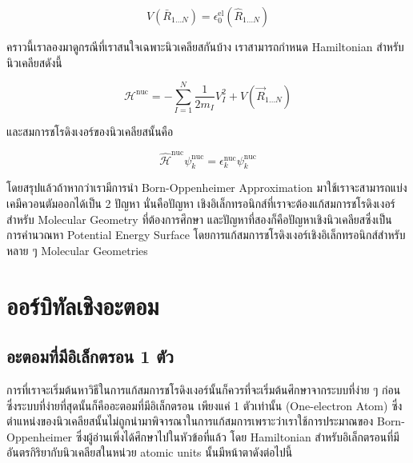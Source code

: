 \begin{equation}
    V\left(\bar{R}_{1 \dots N}\right)
    =
    \epsilon_{0}^{\mathrm{el}}\left(\hat{R}_{1 \dots N}\right)
\end{equation}

คราวนี้เราลองมาดูกรณีที่เราสนใจเฉพาะนิวเคลียสกันบ้าง เราสามารถกำหนด Hamiltonian สำหรับนิวเคลียสดังนี้

\begin{equation}
    \label{eq:hamiltonian_operator_nuclei}
    \mathcal{H}^{\text{nuc}}
    =
    - \sum_{I=1}^{N} \frac{1}{2 m_{I}} V_{I}^{2}
    + V\left(\vec{R}_{1 \dots N}\right)
\end{equation}

\noindent และสมการชโรดิงเงอร์ของนิวเคลียสนั้นคือ

\begin{equation}
    \label{eq:schrodinger_equation_nuclei}
    \hat{\mathscr{H}}^{\text{nuc}} \psi^{\text{nuc}}_{k}
    =
    \epsilon^{\text{nuc}}_{k} \psi^{\text{nuc}}_{k}
\end{equation}

โดยสรุปแล้วถ้าหากว่าเรามีการนำ Born-Oppenheimer Approximation มาใช้เราจะสามารถแบ่งเคมีควอนตัมออกได้เป็น 2 ปัญหา นั่นคือปัญหา%
เชิงอิเล็กทรอนิกส์ที่เราจะต้องแก้สมการชโรดิงเงอร์สำหรับ Molecular Geometry ที่ต้องการศึกษา และปัญหาที่สองก็คือปัญหาเชิงนิวเคลียสซึ่งเป็น%
การคำนวณหา Potential Energy Surface โดยการแก้สมการชโรดิงเงอร์เชิงอิเล็กทรอนิกส์สำหรับหลาย ๆ Molecular Geometries

\section{ออร์บิทัลเชิงอะตอม}

\subsection{อะตอมที่มีอิเล็กตรอน 1 ตัว}

การที่เราจะเริ่มต้นหาวิธีในการแก้สมการชโรดิงเงอร์นั้นก็ควรที่จะเริ่มต้นศึกษาจากระบบที่ง่าย ๆ ก่อนซึ่งระบบที่ง่ายที่สุดนั้นก็คืออะตอมที่มีอิเล็กตรอน%
เพียงแค่ 1 ตัวเท่านั้น (One-electron Atom)  ซึ่งตำแหน่งของนิวเคลียสนั้นไม่ถูกนำมาพิจารณาในการแก้สมการเพราะว่าเราใช้การประมาณของ
Born-Oppenheimer ซึ่งผู้อ่านเพิ่งได้ศึกษาไปในหัวข้อที่แล้ว โดย Hamiltonian สำหรับอิเล็กตรอนที่มีอันตรกิริยากับนิวเคลียสในหน่วย atomic
units นั้นมีหน้าตาดังต่อไปนี้

